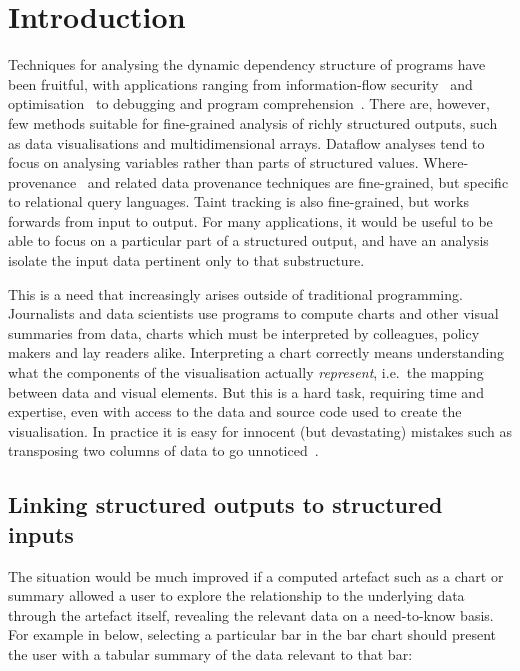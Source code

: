 \section{Introduction}

Techniques for analysing the dynamic dependency structure of programs have been fruitful, with applications ranging from information-flow security~\cite{sabelfeld03} and optimisation~\cite{kildall73} to debugging and program comprehension~\cite{weiser81,delucia96}. There are, however, few methods suitable for fine-grained analysis of richly structured outputs, such as data visualisations and multidimensional arrays. Dataflow analyses \cite{reps95} tend to focus on analysing variables rather than parts of structured values. Where-provenance~\cite{buneman01} and related data provenance techniques are fine-grained, but specific to relational query languages. Taint tracking \cite{newsome05} is also fine-grained, but works forwards from input to output. For many applications, it would be useful to be able to focus on a particular part of a structured output, and have an analysis isolate the input data pertinent only to that substructure.

This is a need that increasingly arises outside of traditional programming. Journalists and data scientists use programs to compute charts and other visual summaries from data, charts which must be interpreted by colleagues, policy makers and lay readers alike. Interpreting a chart correctly means understanding what the components of the visualisation actually \emph{represent}, i.e.~the mapping between data and visual elements. But this is a hard task, requiring time and expertise, even with access to the data and source code used to create the visualisation. In practice it is easy for innocent (but devastating) mistakes such as transposing two columns of data to go unnoticed~\cite{miller06}.


\subsection{Linking structured outputs to structured inputs}

The situation would be much improved if a computed artefact such as a chart or summary allowed a user to explore the relationship to the underlying data through the artefact itself, revealing the relevant data on a need-to-know basis. For example in  below, selecting a particular bar in the bar chart should present the user with a tabular summary of the data relevant to that bar:

